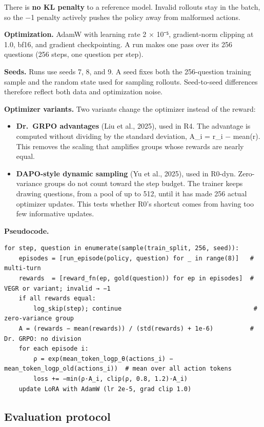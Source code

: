 There is \textbf{no KL penalty} to a reference model. Invalid rollouts
stay in the batch, so the −1 penalty actively pushes the policy away
from malformed actions.

\textbf{Optimization.} AdamW with learning rate 2 × 10⁻⁵, gradient-norm
clipping at 1.0, bf16, and gradient checkpointing. A run makes one pass
over its 256 questions (256 steps, one question per step).

\textbf{Seeds.} Runs use seeds 7, 8, and 9. A seed fixes both the
256-question training sample and the random state used for sampling
rollouts. Seed-to-seed differences therefore reflect both data and
optimization noise.

\textbf{Optimizer variants.} Two variants change the optimizer instead
of the reward:

\begin{itemize}
\tightlist
\item
  \textbf{Dr.~GRPO advantages} (Liu et al., 2025), used in R4. The
  advantage is computed without dividing by the standard deviation, A\_i
  = r\_i − mean(r). This removes the scaling that amplifies groups whose
  rewards are nearly equal.
\item
  \textbf{DAPO-style dynamic sampling} (Yu et al., 2025), used in
  R0-dyn. Zero-variance groups do not count toward the step budget. The
  trainer keeps drawing questions, from a pool of up to 512, until it
  has made 256 actual optimizer updates. This tests whether R0's
  shortcut comes from having too few informative updates.
\end{itemize}

\textbf{Pseudocode.}

\begin{Verbatim}
for step, question in enumerate(sample(train_split, 256, seed)):
    episodes = [run_episode(policy, question) for _ in range(8)]   # multi-turn
    rewards  = [reward_fn(ep, gold(question)) for ep in episodes]  # VEGR or variant; invalid → −1
    if all rewards equal:
        log_skip(step); continue                                    # zero-variance group
    A = (rewards − mean(rewards)) / (std(rewards) + 1e-6)          # Dr. GRPO: no division
    for each episode i:
        ρ = exp(mean_token_logp_θ(actions_i) − mean_token_logp_old(actions_i))  # mean over all action tokens
        loss += −min(ρ·A_i, clip(ρ, 0.8, 1.2)·A_i)
    update LoRA with AdamW (lr 2e-5, grad clip 1.0)
\end{Verbatim}

\subsection{Evaluation protocol}\label{sec:3.7}

